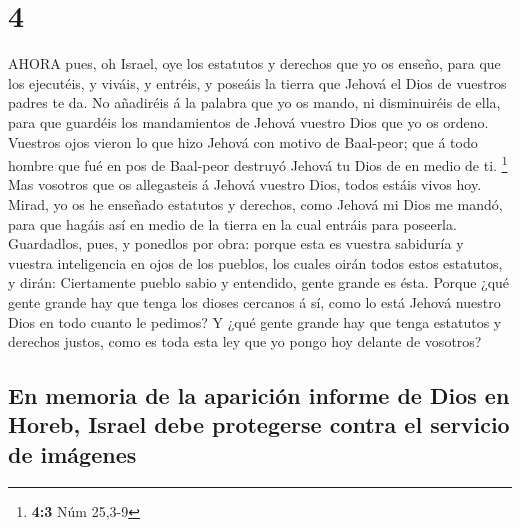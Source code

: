 \hypertarget{section-3}{%
\section{4}\label{section-3}}

 AHORA pues, oh Israel, oye los estatutos y derechos que yo
os enseño, para que los ejecutéis, y viváis, y entréis, y poseáis la
tierra que Jehová el Dios de vuestros padres te da.  No
añadiréis á la palabra que yo os mando, ni disminuiréis de ella, para
que guardéis los mandamientos de Jehová vuestro Dios que yo os ordeno.
 Vuestros ojos vieron lo que hizo Jehová con motivo de
Baal-peor; que á todo hombre que fué en pos de Baal-peor destruyó Jehová
tu Dios de en medio de ti. \footnote{\textbf{4:3} Núm 25,3-9}
 Mas vosotros que os allegasteis á Jehová vuestro Dios,
todos estáis vivos hoy.  Mirad, yo os he enseñado estatutos
y derechos, como Jehová mi Dios me mandó, para que hagáis así en medio
de la tierra en la cual entráis para poseerla.  Guardadlos,
pues, y ponedlos por obra: porque esta es vuestra sabiduría y vuestra
inteligencia en ojos de los pueblos, los cuales oirán todos estos
estatutos, y dirán: Ciertamente pueblo sabio y entendido, gente grande
es ésta.  Porque ¿qué gente grande hay que tenga los dioses
cercanos á sí, como lo está Jehová nuestro Dios en todo cuanto le
pedimos?  Y ¿qué gente grande hay que tenga estatutos y
derechos justos, como es toda esta ley que yo pongo hoy delante de
vosotros?

\hypertarget{en-memoria-de-la-apariciuxf3n-informe-de-dios-en-horeb-israel-debe-protegerse-contra-el-servicio-de-imuxe1genes}{%
\subsection{En memoria de la aparición informe de Dios en Horeb, Israel
debe protegerse contra el servicio de
imágenes}\label{en-memoria-de-la-apariciuxf3n-informe-de-dios-en-horeb-israel-debe-protegerse-contra-el-servicio-de-imuxe1genes}}

